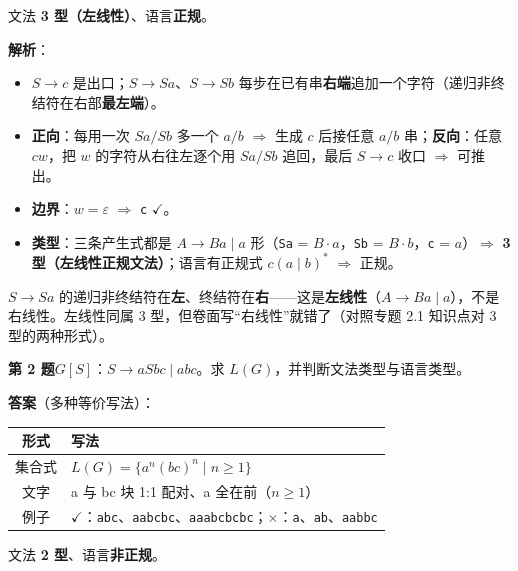 \documentclass[12pt,a4paper,fontset=windows]{ctexart}
\newcommand{\ok}{\ensuremath{\checkmark}}
\newcommand{\bad}{\ensuremath{\times}}
\newcommand{\imp}{\ensuremath{\Rightarrow}}
\begin{document}
文法 \textbf{3 型（左线性）}、语言\textbf{正规}。

\textbf{解析}：
\begin{itemize}
\item $S \to c$ 是出口；$S \to Sa$、$S \to Sb$ 每步在已有串\textbf{右端}追加一个字符（递归非终结符在右部\textbf{最左端}）。
\item \textbf{正向}：每用一次 $Sa/Sb$ 多一个 $a/b$ \imp{} 生成 $c$ 后接任意 $a/b$ 串；\textbf{反向}：任意 $c w$，把 $w$ 的字符从右往左逐个用 $Sa/Sb$ 追回，最后 $S \to c$ 收口 \imp{} 可推出。
\item \textbf{边界}：$w = \varepsilon$ \imp{} \texttt{c} \ok。
\item \textbf{类型}：三条产生式都是 $A \to Ba \mid a$ 形（\texttt{Sa} = $B \cdot a$，\texttt{Sb} = $B \cdot b$，\texttt{c} = $a$）\imp{} \textbf{3 型（左线性正规文法）}；语言有正规式 $c(a \mid b)^*$ \imp{} 正规。
\end{itemize}

\begin{warnbox}[方向别判反]
$S \to Sa$ 的递归非终结符在\textbf{左}、终结符在\textbf{右}——这是\textbf{左线性}（$A \to Ba \mid a$），不是右线性。左线性同属 3 型，但卷面写``右线性''就错了（对照专题 2.1 知识点对 3 型的两种形式）。
\end{warnbox}

\begin{qbox}
{\large\bfseries 第 2 题}\quad $G[S]$：$S \to aSbc \mid abc$。求 $L(G)$，并判断文法类型与语言类型。
\end{qbox}

\textbf{答案}（多种等价写法）：

\begin{center}
\renewcommand{\arraystretch}{1.25}
\begin{tabular}{c p{11.2cm}}
\toprule
\textbf{形式} & \textbf{写法} \\
\midrule
集合式 & $L(G)=\{a^n (bc)^n \mid n \ge 1\}$ \\
文字 & a 与 bc 块 1:1 配对、a 全在前（$n \ge 1$） \\
例子 & \ok：\texttt{abc}、\texttt{aabcbc}、\texttt{aaabcbcbc}；\bad：\texttt{a}、\texttt{ab}、\texttt{aabbc} \\
\bottomrule
\end{tabular}
\end{center}

文法 \textbf{2 型}、语言\textbf{非正规}。
\end{document}
